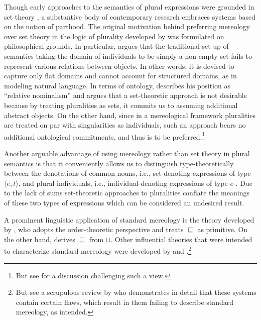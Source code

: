 \begin{sloppypar}
Though early approaches to the semantics of plural expressions were grounded in set theory \citep{bennet1974some,hausser1974quantification}, a substantive body of contemporary research embraces systems based on the notion of parthood. The original motivation behind preferring mereology over set theory in the logic of plurality developed by \citet{link1983logical,link1998algebraic} was formulated on philosophical grounds. In particular, \citeauthor{link1998algebraic} argues that the traditional set-up of semantics taking the domain of individuals to be simply a non-empty set fails to represent various relations between objects. In other words, it is devised to capture only flat domains and cannot account for structured domains, as in modeling natural language. In terms of ontology, \citeauthor{link1998algebraic} describes his position as ``relative nominalism'' and argues that a set-theoretic approach is not desirable because by treating pluralities as sets, it commits us to assuming additional abstract objects. On the other hand, since in a mereological framework pluralities are treated on par with singularities as individuals, such an approach bears no additional ontological commitments, and thus is to be preferred.\footnote{But see \citet{landman1989groupsi} for a discussion challenging such a view.}
\end{sloppypar}

Another arguable advantage of using mereology rather than set theory in plural semantics is that it conveniently allows us to distinguish type-theoretically between the denotations of common nouns, i.e., set-denoting expressions of type $\langle e,t\rangle$, and plural individuals, i.e., individual-denoting expressions of type $e$ \citep[see also][]{vaillette2001flexible,champollion2017parts}. Due to the lack of sums set-theoretic approaches to pluralities conflate the meanings of these two types of expressions which can be considered an undesired result. 

A prominent linguistic application of standard mereology is the theory developed by \citet{champollion2017parts}, who adopts the order-theoretic perspective and treats $\sqsubseteq$ as primitive. On the other hand, \citet{krifka1998origins} derives $\sqsubseteq$ from $\sqcup$. Other influential theories that were intended to characterize standard mereology were developed by \citet{link1983logical,link1998algebraic} and \citet{landman1989groupsi,landman1991structures,landman2000events}.\footnote{But see a scrupulous review by \citet{hovda2009classical} who demonstrates in detail that these systems contain certain flaws, which result in them failing to describe standard mereology, as intended.}

